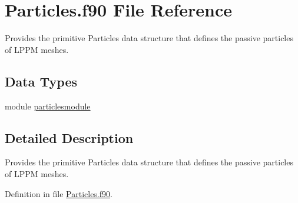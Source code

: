 \hypertarget{Particles_8f90}{\section{Particles.\+f90 File Reference}
\label{Particles_8f90}
}


Provides the primitive Particles data structure that defines the passive particles of L\+P\+P\+M meshes.  


\subsection*{Data Types}
\begin{DoxyCompactItemize}
\item 
module \hyperlink{classparticlesmodule}{particlesmodule}
\end{DoxyCompactItemize}


\subsection{Detailed Description}
Provides the primitive Particles data structure that defines the passive particles of L\+P\+P\+M meshes. 



Definition in file \hyperlink{Particles_8f90_source}{Particles.\+f90}.

